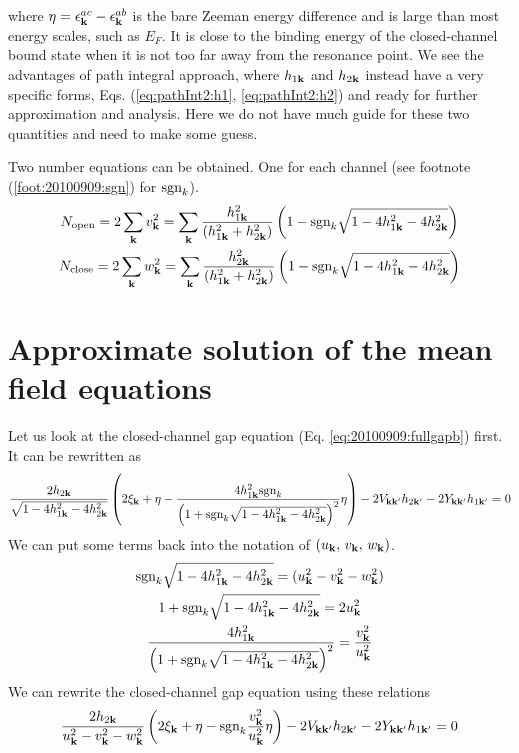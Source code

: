 where $\eta=\epsilon^{ac}_{\mathbf{k}}-\epsilon^{ab}_{\mathbf{k}}$ is the bare Zeeman energy difference and is large than most energy scales, such as $E_{F}$.  It is close to  the binding energy of the closed-channel bound state when it is not too far away from the resonance point.   We see the advantages of path integral approach, where $h_{1\mathbf{k}}$ and $h_{2\mathbf{k}}$ instead have a very specific forms, Eqs. (\ref{eq:pathInt2:h1}, \ref{eq:pathInt2:h2}) and ready for further approximation and analysis.  Here we do not have much guide for these two quantities and need to make some guess.  

Two number equations can be obtained.  One for each channel (see footnote (\ref{foot:20100909:sgn}) for $\text{sgn}_{k}$).
\begin{gather}\label{eq:20100909:number}
N_{\text{open}}=2\sum_{\mathbf{k}}v_{\mathbf{k}}^{2}
	=\sum_{\mathbf{k}}\frac{ h_{1\mathbf{k}}^2}{( h_{1\mathbf{k}}^2+ h_{2\mathbf{k}}^2)} \left(1-\text{sgn}_{k}\sqrt{1-4 h_{1\mathbf{k}}^2-4 h_{2\mathbf{k}}^2}\right)\\
N_{\text{close}}=2\sum_{\mathbf{k}}w_{\mathbf{k}}^{2}
	=\sum_{\mathbf{k}}\frac{ h_{2\mathbf{k}}^2}{( h_{1\mathbf{k}}^2+ h_{2\mathbf{k}}^2)} \left(1-\text{sgn}_{k}\sqrt{1-4 h_{1\mathbf{k}}^2-4 h_{2\mathbf{k}}^2}\right)
\end{gather} 


\section{Approximate solution of the mean field equations}
Let us look at the closed-channel gap equation (Eq. \ref{eq:20100909:fullgapb}) first.  It can be rewritten as 
\begin{equation*}
\frac{2h_{2\mathbf{k}}}{\sqrt{1-4 h_{1\mathbf{k}}^2-4 h_{2\mathbf{k}}^2}}\left(2 \xi_{\mathbf{k}}+\eta-\frac{4 h_{1\mathbf{k}}^{2} \text{sgn}_{k}}{\left(1+\text{sgn}_{k}\sqrt{1-4 h_{1\mathbf{k}}^2-4 h_{2\mathbf{k}}^2}\right)^2}\eta\right)-2V_{\mathbf{k}\mathbf{k}'}h_{2\mathbf{k}'}-2Y_{\mathbf{k}\mathbf{k}'}h_{1\mathbf{k}'}=0
\end{equation*}
We can put some terms back into the notation of $(u_{\mathbf{k}},\,v_{\mathbf{k}},\, w_{\mathbf{k}})$.
\begin{gather}
\text{sgn}_{k}\sqrt{1-4 h_{1\mathbf{k}}^2-4 h_{2\mathbf{k}}^2}=(u^{2}_{\mathbf{k}}-v_{\mathbf{k}}^{2}-w_{\mathbf{k}}^{2})\\
1+\text{sgn}_{k}\sqrt{1-4 h_{1\mathbf{k}}^2-4 h_{2\mathbf{k}}^2}=2u_{\mathbf{k}}^{2}\\
\frac{4 h_{1\mathbf{k}}^{2} }{\left(1+\text{sgn}_{k}\sqrt{1-4 h_{1\mathbf{k}}^2-4 h_{2\mathbf{k}}^2}\right)^2}=\frac{v_{\mathbf{k}}^{2}}{u_{\mathbf{k}}^{2}}
\end{gather}
We can rewrite the closed-channel gap equation using these relations
\begin{equation*}
\frac{2h_{2\mathbf{k}}}{u^{2}_{\mathbf{k}}-v_{\mathbf{k}}^{2}-w_{\mathbf{k}}^{2}}\left(2 \xi_{\mathbf{k}}+\eta-\text{sgn}_{k}\frac{v_{\mathbf{k}}^{2}}{u_{\mathbf{k}}^{2}}\eta\right)-2V_{\mathbf{k}\mathbf{k}'}h_{2\mathbf{k}'}-2Y_{\mathbf{k}\mathbf{k}'}h_{1\mathbf{k}'}=0
\end{equation*}




